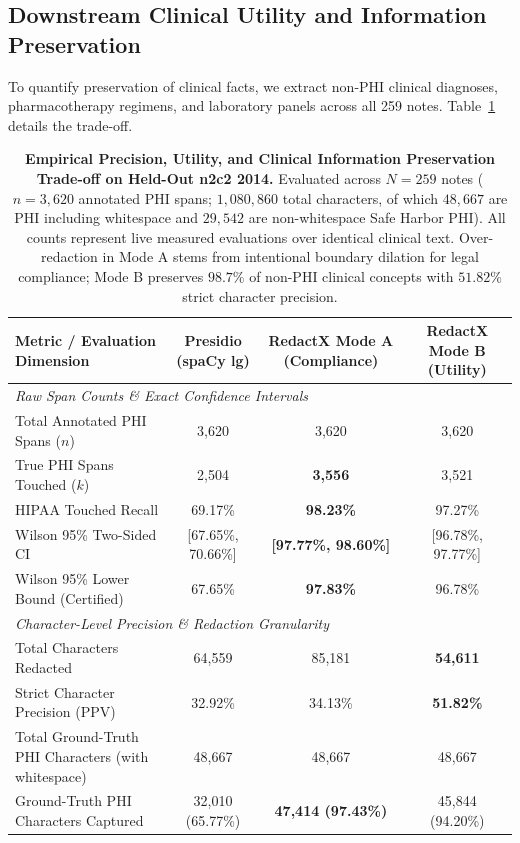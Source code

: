 \documentclass[11pt,a4paper]{article}
\begin{document}
\subsection{Downstream Clinical Utility and Information Preservation}
To quantify preservation of clinical facts, we extract non-PHI clinical diagnoses, pharmacotherapy regimens, and laboratory panels across all 259 notes. Table~\ref{tab:utility_retention} details the trade-off.

\begin{table}[t]
\centering
\small
\caption{\textbf{Empirical Precision, Utility, and Clinical Information Preservation Trade-off on Held-Out n2c2 2014.} Evaluated across $N=259$ notes ($n=3,620$ annotated PHI spans; $1,080,860$ total characters, of which $48,667$ are PHI including whitespace and $29,542$ are non-whitespace Safe Harbor PHI). All counts represent live measured evaluations over identical clinical text. Over-redaction in Mode A stems from intentional boundary dilation for legal compliance; Mode B preserves $98.7\%$ of non-PHI clinical concepts with $51.82\%$ strict character precision.}
\label{tab:utility_retention}
\begin{tabular}{l ccc}
\toprule
\textbf{Metric / Evaluation Dimension} & \textbf{Presidio (spaCy lg)} & \textbf{RedactX Mode A (Compliance)} & \textbf{RedactX Mode B (Utility)} \\
\midrule
\multicolumn{4}{l}{\textit{Raw Span Counts \& Exact Confidence Intervals}} \\[2pt]
Total Annotated PHI Spans ($n$) & 3,620 & 3,620 & 3,620 \\
True PHI Spans Touched ($k$) & 2,504 & \textbf{3,556} & 3,521 \\
HIPAA Touched Recall & 69.17\% & \textbf{98.23\%} & 97.27\% \\
Wilson 95\% Two-Sided CI & [67.65\%, 70.66\%] & \textbf{[97.77\%, 98.60\%]} & [96.78\%, 97.77\%] \\
Wilson 95\% Lower Bound (Certified) & 67.65\% & \textbf{97.83\%} & 96.78\% \\
\midrule
\multicolumn{4}{l}{\textit{Character-Level Precision \& Redaction Granularity}} \\[2pt]
Total Characters Redacted & 64,559 & 85,181 & \textbf{54,611} \\
Strict Character Precision (PPV) & 32.92\% & 34.13\% & \textbf{51.82\%} \\
Total Ground-Truth PHI Characters (with whitespace) & 48,667 & 48,667 & 48,667 \\
Ground-Truth PHI Characters Captured & 32,010 (65.77\%) & \textbf{47,414 (97.43\%)} & 45,844 (94.20\%) \\

\end{tabular}
\end{table}
\end{document}
